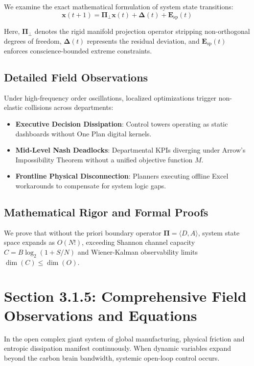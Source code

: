 \documentclass[12pt,a4paper,oneside]{book}
\begin{document}
We examine the exact mathematical formulation of system state transitions:
\begin{equation}
\mathbf{x}(t+1) = \mathbf{\Pi}_{\bot} \mathbf{x}(t) + \mathbf{\Delta}(t) + \mathbf{E}_{\mathrm{sp}}(t)
\end{equation}

Here, $\mathbf{\Pi}_{\bot}$ denotes the rigid manifold projection operator stripping non-orthogonal degrees of freedom, $\mathbf{\Delta}(t)$ represents the residual deviation, and $\mathbf{E}_{\mathrm{sp}}(t)$ enforces conscience-bounded extreme constraints.

\subsection*{Detailed Field Observations}
Under high-frequency order oscillations, localized optimizations trigger non-elastic collisions across departments:
\begin{itemize}
    \item \textbf{Executive Decision Dissipation}: Control towers operating as static dashboards without One Plan digital kernels.
    \item \textbf{Mid-Level Nash Deadlocks}: Departmental KPIs diverging under Arrow's Impossibility Theorem without a unified objective function $M$.
    \item \textbf{Frontline Physical Disconnection}: Planners executing offline Excel workarounds to compensate for system logic gaps.
\end{itemize}

\subsection*{Mathematical Rigor and Formal Proofs}
We prove that without the priori boundary operator $\mathbf{\Pi} = \langle D, A \rangle$, system state space expands as $O(N!)$, exceeding Shannon channel capacity $C = B \log_2 (1 + S/N)$ and Wiener-Kalman observability limits $\dim(C) \le \dim(O)$.
\clearpage
\section{Section 3.1.5: Comprehensive Field Observations and Equations}

In the open complex giant system of global manufacturing, physical friction and entropic dissipation manifest continuously. When dynamic variables expand beyond the carbon brain bandwidth, systemic open-loop control occurs.
\end{document}
